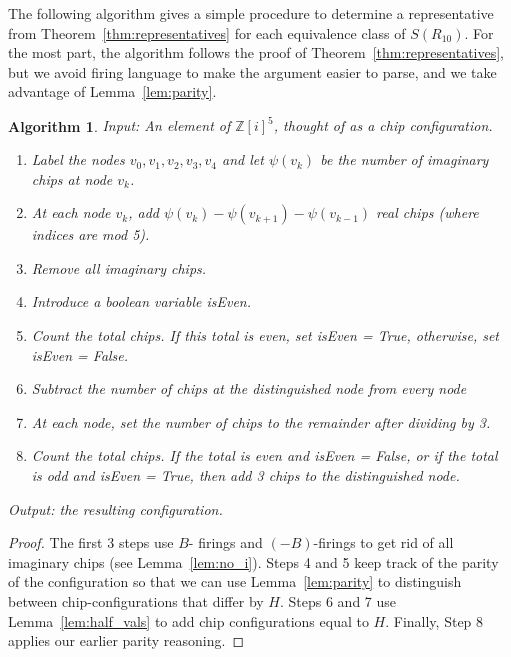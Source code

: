 \documentclass[12p]{amsart}
\numberwithin{equation}{section}
\theoremstyle{plain}
\newtheorem{alg}[thm]{Algorithm}
\theoremstyle{definition}
\newcommand{\Z}{\mathbb {Z}}
\begin{document}
The following algorithm gives a simple procedure to determine a representative from Theorem~\ref{thm:representatives} for each equivalence class of $S(R_{10})$. For the most part, the algorithm follows the proof of Theorem~\ref{thm:representatives}, but we avoid firing language to make the argument easier to parse, and we take advantage of Lemma~\ref{lem:parity}. 

\begin{alg}\label{alg:stabilize}
    Input: An element of $\Z[i]^5$, thought of as a chip configuration.
    \begin{enumerate}[1.]
        \item Label the nodes $v_0,v_1,v_2,v_3,v_4$ and let $\psi(v_k)$ be the number of imaginary chips at node $v_k$. 
        \item At each node $v_k$, add $\psi(v_{k}) - \psi(v_{k+1}) - \psi(v_{k-1})$ real chips (where indices are mod 5). 
        \item Remove all imaginary chips. 
        \item Introduce a boolean variable isEven.
        \item Count the total chips. If this total is even, set isEven = True, otherwise, set isEven = False. 
        \item Subtract the number of chips at the distinguished node from every node
        \item At each node, set the number of chips to the remainder after dividing by 3. 
        \item Count the total chips. If the total is even and isEven = False, or if the total is odd and isEven = True, then add 3 chips to the distinguished node. 
    \end{enumerate}    
    Output: the resulting configuration.
\end{alg}
\begin{proof}
The first 3 steps use $B$- firings and $(-B)$-firings to get rid of all imaginary chips (see Lemma~\ref{lem:no_i}). Steps 4 and 5 keep track of the parity of the configuration so that we can use Lemma~\ref{lem:parity} to distinguish between chip-configurations that differ by $H$. Steps 6 and 7 use Lemma~\ref{lem:half_vals} to add chip configurations equal to $H$. Finally, Step 8 applies our earlier parity reasoning. 
\end{proof}
\end{document}
